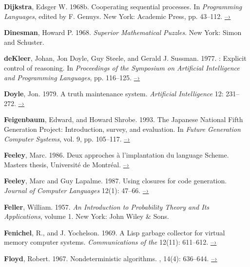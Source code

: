  \label{Dijkstra 1968b}
\textbf{Dijkstra}, Edsger W. 1968b.  Cooperating sequential processes.  In
\textit{Programming Languages}, edited by F. Genuys. New York: Academic Press,
pp.  43--112.
\href{http://www.cs.utexas.edu/users/EWD/ewd01xx/EWD123.PDF}{–›}

 \label{Dinesman 1968}
\textbf{Dinesman}, Howard P.  1968.  \textit{Superior Mathematical Puzzles}.  New York:
Simon and Schuster.

 \label{deKleer et al. 1977}
\textbf{deKleer}, Johan, Jon Doyle, Guy Steele, and Gerald J. Sussman.  1977.
: Explicit control of reasoning.  In \textit{Proceedings of the
 Symposium on Artificial Intelligence and Programming Languages},
pp.  116--125.
\href{http://dspace.mit.edu/handle/1721.1/5750}{–›}

 \label{Doyle (1979)}
\textbf{Doyle}, Jon. 1979. A truth maintenance system. \textit{Artificial Intelligence}
12: 231--272.
\href{http://dspace.mit.edu/handle/1721.1/5733}{–›}

 \label{Feigenbaum and Shrobe 1993}
\textbf{Feigenbaum}, Edward, and Howard Shrobe. 1993. The Japanese National Fifth
Generation Project: Introduction, survey, and evaluation.  In \textit{Future
Generation Computer Systems}, vol. 9, pp. 105--117.
\href{https://saltworks.stanford.edu/assets/kv359wz9060.pdf}{–›}

 \label{Feeley (1986)}
\textbf{Feeley}, Marc.  1986.  Deux approches à l’implantation du language
Scheme.  Masters thesis, Université de Montréal.
\href{http://www.iro.umontreal.ca/~feeley/papers/FeeleyMSc.pdf}{–›}

 \label{Feeley and Lapalme 1987}
\textbf{Feeley}, Marc and Guy Lapalme.  1987.  Using closures for code generation.
\textit{Journal of Computer Languages} 12(1): 47--66.
\href{http://citeseerx.ist.psu.edu/viewdoc/summary?doi=10.1.1.90.6978}{–›}

\textbf{Feller}, William.  1957.  \textit{An Introduction to Probability Theory and Its
Applications}, volume 1. New York: John Wiley \& Sons.

 \label{Fenichel and Yochelson (1969)}
\textbf{Fenichel}, R., and J. Yochelson.  1969.  A Lisp garbage collector for virtual
memory computer systems.  \textit{Communications of the }
12(11): 611--612.
\href{https://www.cs.purdue.edu/homes/hosking/690M/p611-fenichel.pdf}{–›}

 \label{Floyd (1967)}
\textbf{Floyd}, Robert. 1967. Nondeterministic algorithms. \textit{},
14(4): 636--644.
\href{http://citeseerx.ist.psu.edu/viewdoc/summary?doi=10.1.1.332.36}{–›}

